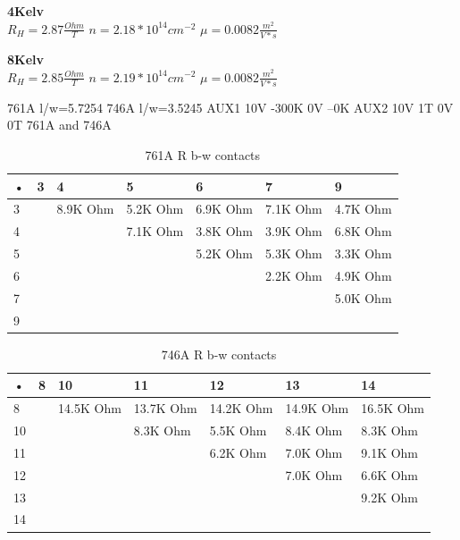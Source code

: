 \documentclass[idxtotoc,hyperref,openany,oneside]{labbook} %
\begin{document}
\normalsize \textbf{4Kelv}\\
$R_H=2.87 \frac{Ohm}{T}$
\newline
$n=2.18*10^{14} cm^{-2}$
\newline
$\mu= 0.0082\frac{m^2}{V*s}$
\newline
\newline

\normalsize \textbf{8Kelv}\\
$R_H=2.85 \frac{Ohm}{T}$
\newline
$n=2.19*10^{14} cm^{-2}$
\newline
$\mu= 0.0082\frac{m^2}{V*s}$
\newline
\newline


761A l/w=5.7254
\newline
746A  l/w=3.5245
\newline
AUX1 10V -300K 0V --0K
\newline
AUX2 10V 1T   0V 0T
\newline
761A and 746A
\newline
\begin{table}[H]
\begin{tabular}{l l l l l l l}
\toprule
\textbf{•} & \textbf{3} & \textbf{4} & \textbf{5}& \textbf{6}& \textbf{7}& \textbf{9}\\
\toprule
 3&   & 8.9K Ohm & 5.2K Ohm & 6.9K Ohm & 7.1K Ohm & 4.7K Ohm\\
 4 &  &  & 7.1K Ohm & 3.8K Ohm & 3.9K Ohm &6.8K Ohm\\
 5 &  &  & & 5.2K Ohm & 5.3K Ohm & 3.3K Ohm\\
 6 & & & &  & 2.2K Ohm & 4.9K Ohm\\
 7 & & & & & &5.0K Ohm  \\
 9 &  &  & & &  &\\
\bottomrule
\end{tabular}
\caption{761A  R b-w contacts}
\label{tab:761A  R b-w contacts}
\end{table}

\begin{table}[H]
\begin{tabular}{l l l l l l l}
\toprule
\textbf{•} & \textbf{8} & \textbf{10} & \textbf{11}& \textbf{12}& \textbf{13}& \textbf{14}\\
\toprule
 8&   & 14.5K Ohm & 13.7K Ohm & 14.2K Ohm & 14.9K Ohm & 16.5K Ohm\\
 10 &  &  & 8.3K Ohm & 5.5K Ohm & 8.4K Ohm &8.3K Ohm\\
 11 &  &  & & 6.2K Ohm & 7.0K Ohm & 9.1K Ohm\\
 12 & & & &  & 7.0K Ohm & 6.6K Ohm\\
 13 & & & & & &9.2K Ohm  \\
 14 &  &  & & &  &\\
\bottomrule
\end{tabular}
\caption{746A  R b-w contacts}
\label{tab:746A  R b-w contacts}
\end{table}
\end{document}
